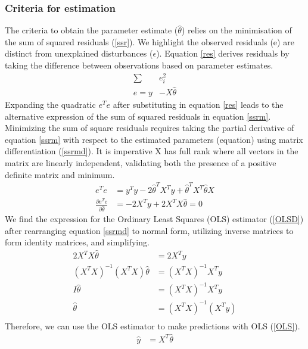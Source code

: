 \documentclass[12pt]{article}
\begin{document}
\subsubsection{Criteria for estimation}
The criteria to obtain the parameter estimate ($\hat{\theta}$) relies on the minimisation of the sum of squared residuals (\ref{ssr}).
We highlight the observed residuals (e) are distinct from unexplained disturbances ($\epsilon$).
Equation \ref{res} derives residuals by taking the difference between observations based on parameter estimates.
\begin{align}
	\sum & e_i^2  \label{ssr}\\
	e = y & - X \hat{\theta} \label{res}
\end{align}
Expanding the quadratic $e^{T}e$ after substituting in equation \ref{res} leads to the alternative expression of the sum of squared residuals in equation \ref{ssrm}.
Minimizing the sum of square residuals requires taking the partial derivative of equation \ref{ssrm} with respect to the estimated parameters (equation) using matrix differentiation (\ref{ssrmd}).
It is imperative X has full rank where all vectors in the matrix are linearly independent, validating both the presence of a positive definite matrix and minimum.
\begin{align}
	e^{T}e &= y^{T}y - 2\hat{\theta}^{T}X^{T}y + \hat{\theta}^{T}X^{T}\hat{\theta}X \label{ssrm}\\
	\frac{\partial e^{T}e}{\partial \hat{\theta}} &= - 2X^{T}y + 2X^{T}X\hat{\theta} =0 \label{ssrmd}
\end{align}
We find the expression for the Ordinary Least Squares (OLS) estimator (\ref{OLSD}) after rearranging equation \ref{ssrmd} to normal form, utilizing inverse matrices to form identity matrices, and simplifying.
\begin{align}
	2X^{T}X\hat{\theta} &= 2X^{T}y \\
	(X^{T}X)^{-1}(X^{T}X)\hat{\theta} &= (X^{T}X)^{-1}X^{T}y \\
	I\hat{\theta} &= (X^{T}X)^{-1}X^{T}y \\
	\hat{\theta} &= (X^{T}X)^{-1}(X^{T}y) \label{OLSD}\\
\end{align}
Therefore, we can use the OLS estimator to make predictions with OLS (\ref{OLS}).
\begin{align*}
	\hat{y} &= X^{T} \hat{\theta} \label{OLS}
\end{align*}
\end{document}
